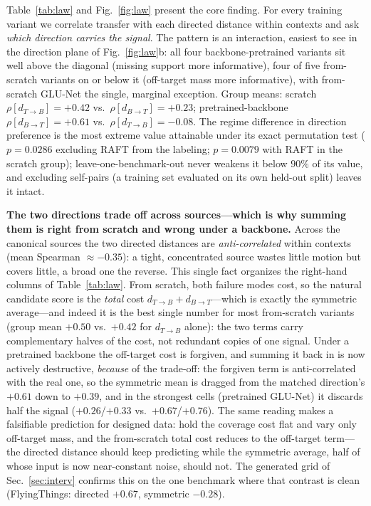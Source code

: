 \documentclass[runningheads]{llncs}
\newcommand{\dtb}{d_{T\to B}}
\newcommand{\dbt}{d_{B\to T}}
\begin{document}
\begin{table}[t]
\centering
\caption{\textbf{The identical analysis in appearance (DINO) space} (the
negative control for Table~\ref{tab:law}): no direction and no symmetric
distance carries usable signal for any variant, and no regime structure
exists. Whatever drives Table~\ref{tab:law} lives in motion, not in what the
frames look like.}
\label{tab:lawdino}
\footnotesize

\end{table}

Table~\ref{tab:law} and Fig.~\ref{fig:law} present the core finding. For
every training variant we correlate transfer with each directed distance
within contexts and ask \emph{which direction carries the signal}. The
pattern is an interaction, easiest to see in the direction plane of
Fig.~\ref{fig:law}b: all four backbone-pretrained variants sit well above
the diagonal (missing support more informative), four of five from-scratch
variants on or below it (off-target mass more informative), with from-scratch
GLU-Net the single, marginal exception. Group means: scratch
$\rho[\dtb]{=}{+}0.42$ vs.\ $\rho[\dbt]{=}{+}0.23$; pretrained-backbone
$\rho[\dbt]{=}{+}0.61$ vs.\ $\rho[\dtb]{=}{-}0.08$. The regime difference in
direction preference is the most extreme value attainable under its exact
permutation test ($p{=}0.0286$ excluding RAFT from the labeling; $p{=}0.0079$
with RAFT in the scratch group); leave-one-benchmark-out never weakens it
below $90\%$ of its value, and excluding self-pairs (a training set evaluated
on its own held-out split) leaves it intact.

\noindent\textbf{The two directions trade off across sources---which is why
summing them is right from scratch and wrong under a backbone.}
Across the canonical sources the two directed distances are
\emph{anti-correlated} within contexts (mean Spearman $\approx{-}0.35$): a
tight, concentrated source wastes little motion but covers little, a broad
one the reverse. This single fact organizes the right-hand columns of
Table~\ref{tab:law}. From scratch, both failure modes cost, so the natural
candidate score is the \emph{total} cost $\dtb{+}\dbt$---which is exactly the
symmetric average---and indeed it is the best single number for most
from-scratch variants (group mean $+0.50$ vs.\ $+0.42$ for $\dtb$ alone):
the two terms carry complementary halves of the cost, not redundant copies
of one signal. Under a pretrained backbone the off-target cost is forgiven,
and summing it back in is now actively destructive, \emph{because} of the
trade-off: the forgiven term is anti-correlated with the real one, so the
symmetric mean is dragged from the matched direction's $+0.61$ down to
$+0.39$, and in the strongest cells (pretrained GLU-Net) it discards half
the signal ($+0.26$/$+0.33$ vs.\ $+0.67$/$+0.76$). The same reading makes a
falsifiable prediction for designed data: hold the coverage cost flat and
vary only off-target mass, and the from-scratch total cost reduces to the
off-target term---the directed distance should keep predicting while the
symmetric average, half of whose input is now near-constant noise, should
not. The generated grid of Sec.~\ref{sec:interv} confirms this on the one
benchmark where that contrast is clean (FlyingThings: directed $+0.67$,
symmetric $-0.28$).
\end{document}
